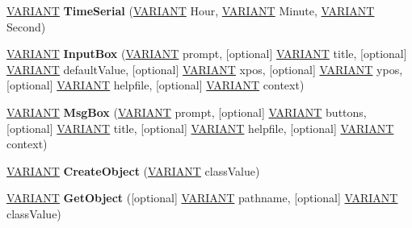 \begin{DoxyCompactItemize}
\hyperlink{structtag_v_a_r_i_a_n_t}{V\+A\+R\+I\+A\+NT} {\bfseries Time\+Serial} (\hyperlink{structtag_v_a_r_i_a_n_t}{V\+A\+R\+I\+A\+NT} Hour, \hyperlink{structtag_v_a_r_i_a_n_t}{V\+A\+R\+I\+A\+NT} Minute, \hyperlink{structtag_v_a_r_i_a_n_t}{V\+A\+R\+I\+A\+NT} Second)
\item 
\mbox{\label{interface_v_b_script___global_1_1_global_obj_a1202fd82e2d661c11a58033e061d4c94}} 
\hyperlink{structtag_v_a_r_i_a_n_t}{V\+A\+R\+I\+A\+NT} {\bfseries Input\+Box} (\hyperlink{structtag_v_a_r_i_a_n_t}{V\+A\+R\+I\+A\+NT} prompt, \mbox{[}optional\mbox{]} \hyperlink{structtag_v_a_r_i_a_n_t}{V\+A\+R\+I\+A\+NT} title, \mbox{[}optional\mbox{]} \hyperlink{structtag_v_a_r_i_a_n_t}{V\+A\+R\+I\+A\+NT} default\+Value, \mbox{[}optional\mbox{]} \hyperlink{structtag_v_a_r_i_a_n_t}{V\+A\+R\+I\+A\+NT} xpos, \mbox{[}optional\mbox{]} \hyperlink{structtag_v_a_r_i_a_n_t}{V\+A\+R\+I\+A\+NT} ypos, \mbox{[}optional\mbox{]} \hyperlink{structtag_v_a_r_i_a_n_t}{V\+A\+R\+I\+A\+NT} helpfile, \mbox{[}optional\mbox{]} \hyperlink{structtag_v_a_r_i_a_n_t}{V\+A\+R\+I\+A\+NT} context)
\item 
\mbox{\label{interface_v_b_script___global_1_1_global_obj_a0806acaa2c65ee1a7795979bfa0240b9}} 
\hyperlink{structtag_v_a_r_i_a_n_t}{V\+A\+R\+I\+A\+NT} {\bfseries Msg\+Box} (\hyperlink{structtag_v_a_r_i_a_n_t}{V\+A\+R\+I\+A\+NT} prompt, \mbox{[}optional\mbox{]} \hyperlink{structtag_v_a_r_i_a_n_t}{V\+A\+R\+I\+A\+NT} buttons, \mbox{[}optional\mbox{]} \hyperlink{structtag_v_a_r_i_a_n_t}{V\+A\+R\+I\+A\+NT} title, \mbox{[}optional\mbox{]} \hyperlink{structtag_v_a_r_i_a_n_t}{V\+A\+R\+I\+A\+NT} helpfile, \mbox{[}optional\mbox{]} \hyperlink{structtag_v_a_r_i_a_n_t}{V\+A\+R\+I\+A\+NT} context)
\item 
\mbox{\label{interface_v_b_script___global_1_1_global_obj_a8ded9b6d2324e1201b50b89b7b0eb04d}} 
\hyperlink{structtag_v_a_r_i_a_n_t}{V\+A\+R\+I\+A\+NT} {\bfseries Create\+Object} (\hyperlink{structtag_v_a_r_i_a_n_t}{V\+A\+R\+I\+A\+NT} class\+Value)
\item 
\mbox{\label{interface_v_b_script___global_1_1_global_obj_a51fe46d7d30a727a224d777937703029}} 
\hyperlink{structtag_v_a_r_i_a_n_t}{V\+A\+R\+I\+A\+NT} {\bfseries Get\+Object} (\mbox{[}optional\mbox{]} \hyperlink{structtag_v_a_r_i_a_n_t}{V\+A\+R\+I\+A\+NT} pathname, \mbox{[}optional\mbox{]} \hyperlink{structtag_v_a_r_i_a_n_t}{V\+A\+R\+I\+A\+NT} class\+Value)

\end{DoxyCompactItemize}
